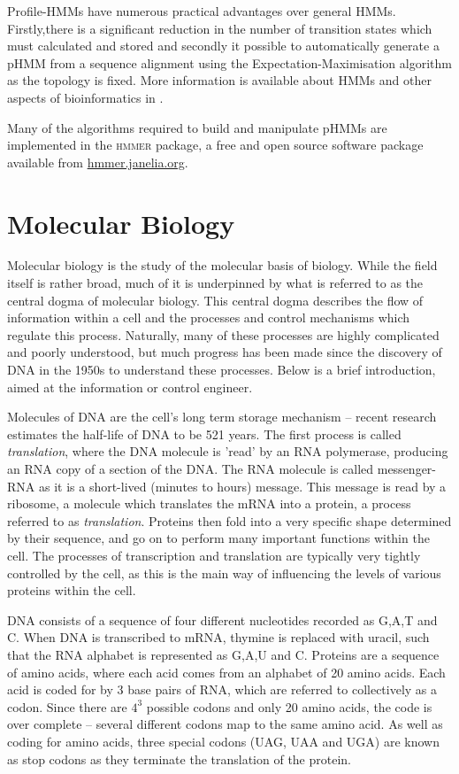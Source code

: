 \documentclass[twoside,a4paper]{article}
\begin{document}
\begin{multicols}{2}
Profile-HMMs have numerous practical advantages over general HMMs. 
Firstly,there is a significant reduction in the number of transition states
which must calculated and stored and secondly it possible to automatically
generate a pHMM from a sequence alignment using the Expectation-Maximisation
algorithm as the topology is fixed. More information is available about HMMs
and other aspects of bioinformatics in \cite{Durbin1998}.

Many of the algorithms required to build and manipulate pHMMs are implemented
in the \textsc{hmmer}\cite{HMMERguide} package, a free and open source software 
package available from \href{http://hmmer.janelia.org/}{hmmer.janelia.org}.

\section{Molecular Biology}
\label{sec:mbio}

Molecular biology is the study of the molecular basis of biology.
While the field itself is rather broad, much of it is underpinned by what is
referred to as the central dogma of molecular biology.
This central dogma describes the flow of information within a cell and the
processes and control mechanisms which regulate this process.
Naturally, many of these processes are highly complicated and poorly
understood, but much progress has been made since the discovery of DNA in the
1950s to understand these processes.
Below is a brief introduction, aimed at the information or control engineer.

Molecules of DNA are the cell's long term storage mechanism -- recent research
estimates the half-life of DNA to be 521 years\cite{DNAhalflife}.
The first process is called \textit{translation}, where the DNA molecule is
'read' by an RNA polymerase, producing an RNA copy of a section of the DNA.
The RNA molecule is called messenger-RNA as it is a short-lived (minutes to
hours) message.
This message is read by a ribosome, a molecule which translates the mRNA into a
protein, a process referred to as \textit{translation}.
Proteins then fold into a very specific shape determined by their 
sequence, and go on to perform many important functions within the cell.
The processes of transcription and translation are typically very tightly
controlled by the cell, as this is the main way of influencing the levels of
various proteins within the cell.

DNA consists of a sequence of four different nucleotides recorded as G,A,T and C.
When DNA is transcribed to mRNA, thymine is replaced with uracil, such that the
RNA alphabet is represented as G,A,U and C.
Proteins are a sequence of amino acids, where each acid comes from an alphabet
of 20 amino acids.
Each acid is coded for by 3 base pairs of RNA, which are referred to
collectively as a codon.
Since there are $4^3$ possible codons and only 20 amino acids, the code is
over complete -- several different codons map to the same amino acid.
As well as coding for amino acids, three special codons (UAG, UAA and UGA) are
known as stop codons as they terminate the translation of the protein.


\end{multicols}
\end{document}
